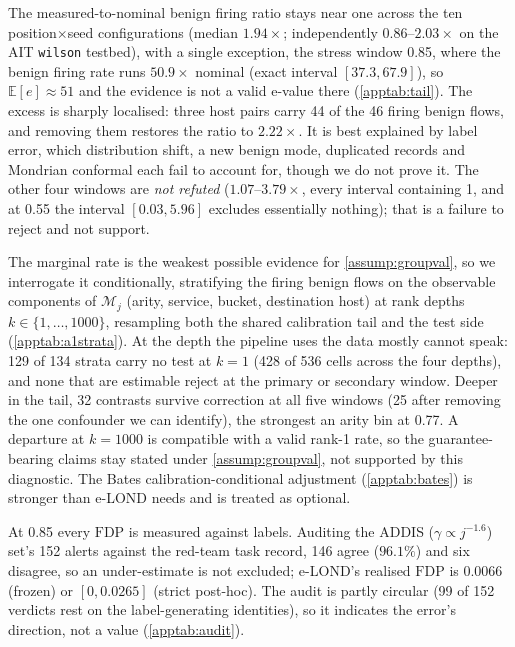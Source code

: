 \documentclass[conference]{IEEEtran}
\newcommand{\FDP}{\mathrm{FDP}}
\begin{document}
The measured-to-nominal benign firing ratio stays near one across the ten position$\times$seed
configurations (median $1.94\times$; independently $0.86$--$2.03\times$ on the AIT \texttt{wilson}
testbed), with a single exception, the stress window 0.85, where the benign firing rate runs $50.9\times$
nominal (exact interval $[37.3,67.9]$), so $\mathbb E[e]\approx51$ and the evidence is not a valid e-value
there (\cref{apptab:tail}). The excess is sharply localised: three host pairs carry 44 of the 46 firing
benign flows, and removing them restores the ratio to $2.22\times$. It is best explained by label error,
which distribution shift, a new benign mode, duplicated records and Mondrian conformal each fail to
account for, though we do not prove it. The other four windows are \emph{not refuted} ($1.07$--$3.79\times$,
every interval containing 1, and at 0.55 the interval $[0.03,5.96]$ excludes essentially nothing); that
is a failure to reject and not support.

The marginal rate is the weakest possible evidence for \cref{assump:groupval}, so we interrogate it
conditionally, stratifying the firing benign flows on the observable components of $\mathcal M_j$ (arity,
service, bucket, destination host) at rank depths $k\in\{1,\ldots,1000\}$, resampling both the shared
calibration tail and the test side (\cref{apptab:a1strata}). At the depth the pipeline uses the data
mostly cannot speak: 129 of 134 strata carry no test at $k=1$ (428 of 536 cells across the four depths),
and none that are estimable reject at the primary or secondary window. Deeper in the tail, 32 contrasts
survive correction at all five windows (25 after removing the one confounder we can identify), the
strongest an arity bin at 0.77. A departure at $k=1000$ is compatible with a valid rank-1 rate, so the
guarantee-bearing claims stay stated under \cref{assump:groupval}, not supported by this diagnostic. The
Bates calibration-conditional adjustment (\cref{apptab:bates}) is stronger than e-LOND needs and is
treated as optional.



At 0.85 every $\FDP$ is measured against labels. Auditing the ADDIS ($\gamma\propto j^{-1.6}$) set's 152
alerts against the red-team task record, 146 agree ($96.1\%$) and six disagree, so an under-estimate is
not excluded; e-LOND's realised $\FDP$ is $0.0066$ (frozen) or $[0,0.0265]$ (strict post-hoc). The audit
is partly circular (99 of 152 verdicts rest on the label-generating identities), so it indicates the
error's direction, not a value (\cref{apptab:audit}).
\end{document}

